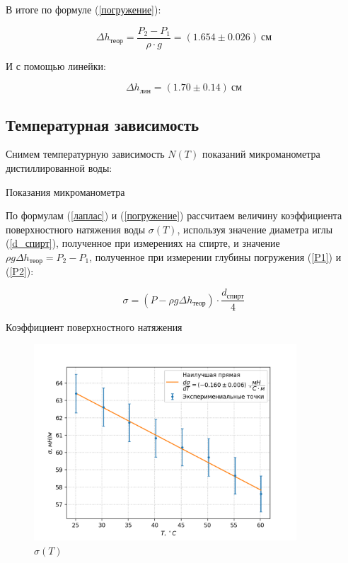 \documentclass[a4paper,12pt]{article} %
\begin{document}
В итоге по формуле (\ref{погружение}):

\begin{equation}\label{h_теор}
	\Delta h_{теор} = \dfrac{P_2 - P_1}{\rho \cdot g} = (1.654 \pm 0.026) \ см
\end{equation}

И с помощью линейки:

\begin{equation}\label{h_лин}
	\Delta h_{лин} = (1.70 \pm 0.14) \ см
\end{equation}

\subsection*{Температурная зависимость}

Снимем температурную зависимость $N(T)$ показаний микроманометра дистиллированной воды:

\begin{table}[ht!]
	\centering
	
	\caption{Показания микроманометра}
\end{table}

По формулам (\ref{лаплас}) и (\ref{погружение}) рассчитаем величину коэффициента поверхностного натяжения воды $\sigma(T)$, используя значение диаметра иглы (\ref{d_спирт}), полученное при измерениях на спирте, и значение $\rho g \Delta h_{теор} = P_2 - P_1$, полученное при измерении глубины погружения (\ref{P1}) и (\ref{P2}):

$$\sigma = (P - \rho g \Delta h_{теор}) \cdot \dfrac{d_{спирт}}{4} $$

\begin{table}[ht!]
	\centering
	
	\caption{Коэффициент поверхностного натяжения}
\end{table}

\newpage


\begin{figure}[h!]
\begin{center}
\includegraphics[width=0.875\textwidth]{8.png}
\end{center}
\caption{$\sigma(T)$}\label{sigma(T)}
\end{figure}
\end{document}
